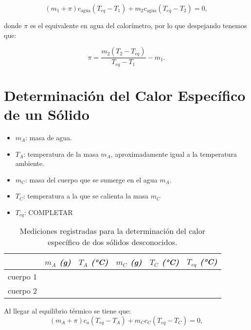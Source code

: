 \documentclass[12pt, a4paper]{article}
\begin{document}
\begin{equation}
    (m_1 + \pi) c_{\text{agua}} (T_{eq} - T_1) + m_2 c_{\text{agua}} (T_{eq} - T_2) = 0,
\end{equation}

\noindent donde $\pi$ es el equivalente en agua del calorímetro, por lo que despejando tenemos que:

\begin{equation}
    \pi = \frac{m_2 (T_2 - T_{eq})}{T_{eq} - T_1} - m_1.
\end{equation}



\section{Determinación del Calor Específico de un Sólido}

\begin{itemize}
    \item $m_A$: masa de agua.
    \item $T_A$: temperatura de la masa $m_A$, aproximadamente igual a la temperatura ambiente.
    \item $m_C$: masa del cuerpo que se sumerge en el agua $m_A$.
    \item $T_C$: temperatura a la que se calienta la masa $m_C$
    \item $T_{eq}$: COMPLETAR
\end{itemize}


\begin{table}[h!]
\centering
\begin{tabular}{|c|c|c|c|c|c|}
\hline
 & \textit{$m_A$ (g)} & \textit{$T_A$ (°C)} & \textit{$m_C$ (g)} & \textit{$T_C$ (°C)} & \textit{$T_{eq}$ (°C)} \\
\hline
cuerpo 1 & & & & & \\
\hline
cuerpo 2 & & & & & \\
\hline
\end{tabular}
\caption{Mediciones registradas para la determinación del calor específico de dos sólidos desconocidos.}
\end{table}

Al llegar al equilibrio térmico se tiene que:
\begin{equation}
    (m_A + \pi) c_a (T_{eq} - T_A) + m_C c_C (T_{eq} - T_C) = 0,
\end{equation}
\end{document}
